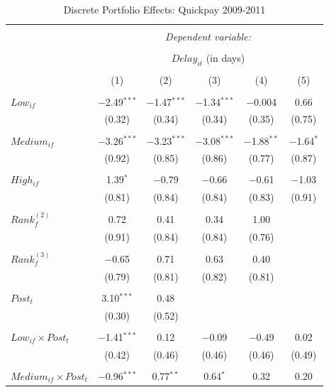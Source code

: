 \documentclass[
]{article}
\begin{document}
\begin{table}[H] \centering 
  \caption{Discrete Portfolio Effects: Quickpay 2009-2011} 
  \label{} 
\small 
\begin{tabular}{@{\extracolsep{-2pt}}lccccc} 
\\[-1.8ex]\hline 
\hline \\[-1.8ex] 
 & \multicolumn{5}{c}{\textit{Dependent variable:}} \\ 
\cline{2-6} 
\\[-1.8ex] & \multicolumn{5}{c}{$Delay_{it}$ (in days)} \\ 
\\[-1.8ex] & (1) & (2) & (3) & (4) & (5)\\ 
\hline \\[-1.8ex] 
 $Low_{if}$ & $-$2.49$^{***}$ & $-$1.47$^{***}$ & $-$1.34$^{***}$ & $-$0.004 & 0.66 \\ 
  & (0.32) & (0.34) & (0.34) & (0.35) & (0.75) \\ 
  & & & & & \\ 
 $Medium_{if}$ & $-$3.26$^{***}$ & $-$3.23$^{***}$ & $-$3.08$^{***}$ & $-$1.88$^{**}$ & $-$1.64$^{*}$ \\ 
  & (0.92) & (0.85) & (0.86) & (0.77) & (0.87) \\ 
  & & & & & \\ 
 $High_{if}$ & 1.39$^{*}$ & $-$0.79 & $-$0.66 & $-$0.61 & $-$1.03 \\ 
  & (0.81) & (0.84) & (0.84) & (0.83) & (0.91) \\ 
  & & & & & \\ 
 $Rank_f^{(2)}$ & 0.72 & 0.41 & 0.34 & 1.00 &  \\ 
  & (0.91) & (0.84) & (0.84) & (0.76) &  \\ 
  & & & & & \\ 
 $Rank_f^{(3)}$ & $-$0.65 & 0.71 & 0.63 & 0.40 &  \\ 
  & (0.79) & (0.81) & (0.82) & (0.81) &  \\ 
  & & & & & \\ 
 $Post_t$ & 3.10$^{***}$ & 0.48 &  &  &  \\ 
  & (0.30) & (0.52) &  &  &  \\ 
  & & & & & \\ 
 $Low_{if} \times Post_t$ & $-$1.41$^{***}$ & 0.12 & $-$0.09 & $-$0.49 & 0.02 \\ 
  & (0.42) & (0.46) & (0.46) & (0.46) & (0.49) \\ 
  & & & & & \\ 
 $Medium_{if} \times Post_t$ & $-$0.96$^{***}$ & 0.77$^{**}$ & 0.64$^{*}$ & 0.32 & 0.20 \\ 

\end{tabular}
\end{table}
\end{document}
